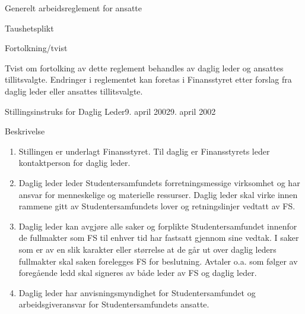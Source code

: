 \begin{lovkapittel}{Generelt arbeidsreglement for ansatte}
\begin{lovparagraf}{Taushetsplikt}
    \end{lovparagraf}

    \begin{lovparagraf}{Fortolkning/tvist}

        Tvist om fortolking av dette reglement behandles av daglig leder og ansattes tillitsvalgte. Endringer i reglementet kan
        foretas i Finansstyret etter forslag fra daglig leder eller ansattes tillitsvalgte.

    \end{lovparagraf}


\end{lovkapittel}


\begin{instruks}{Stillingsinstruks for Daglig Leder}{9. april 2002}{9. april 2002}

    \begin{instruksledd}{Beskrivelse}
        \begin{enumerate}
            \item Stillingen er underlagt Finansstyret. Til daglig er Finansstyrets leder kontaktperson for daglig leder.
            \item Daglig leder leder Studentersamfundets forretningsmessige virksomhet og har ansvar for menneskelige og materielle
                ressurser. Daglig leder skal virke innen rammene gitt av Studentersamfundets lover og retningslinjer vedtatt av FS.
            \item Daglig leder kan avgjøre alle saker og forplikte Studentersamfundet innenfor de fullmakter som FS til enhver tid har
                fastsatt gjennom sine vedtak. I saker som er av en slik karakter eller størrelse at de går ut over daglig leders
                fullmakter skal saken forelegges FS for beslutning. Avtaler o.a. som følger av foregående ledd skal signeres
                av både leder av FS og daglig leder.
            \item Daglig leder har anvisningsmyndighet for Studentersamfundet og arbeidsgiveransvar for Studentersamfundets ansatte.
        \end{enumerate}

    \end{instruksledd}


\end{instruks}
